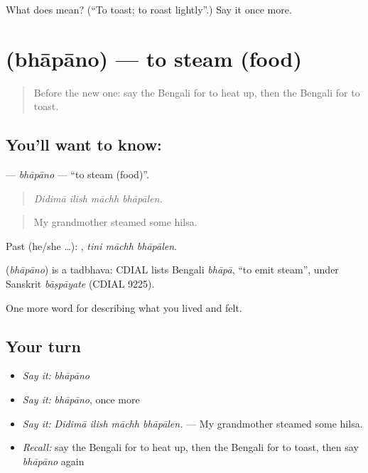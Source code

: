 \begin{tcolorbox}[breakable,colback=teal!4,colframe=teal!35!black,title={Before you move on}]
What does  mean? (\textquotedblleft{}To toast; to roast lightly\textquotedblright{}.) Say it once more.
\end{tcolorbox}
\section[\texorpdfstring{\bn{ভাপানো} (bhāpāno)}{ভাপানো (bhāpāno)}]{ (bhāpāno) — to steam (food)}

\label{lesson:BN-C514-bhapano}



\begin{quote}
Before the new one: say the Bengali for to heat up, then the Bengali for to toast.
\end{quote}

\subsection*{You'll want to know: }
\textbf{} — \emph{bhāpāno} — \textquotedblleft{}to steam (food)\textquotedblright{}.

\begin{quote}
   
\end{quote}

\begin{quote}
\emph{Didimā ilish māchh bhāpālen.}
\end{quote}

\begin{quote}
My grandmother steamed some hilsa.
\end{quote}

Past (he/she …):   , \emph{tini māchh bhāpālen}.

\begin{cousinweb}
\textbf{} (\emph{bhāpāno}) is a tadbhava: CDIAL lists Bengali \emph{bhāpā}, \textquotedblleft{}to emit steam\textquotedblright{}, under Sanskrit \emph{bāṣpāyate} (CDIAL 9225).
\end{cousinweb}

\begin{grammarlens}[title={What you've built}]
One more word for describing what you lived and felt.
\end{grammarlens}

\subsection*{Your turn}
\begin{itemize}
\raggedright
  \item \emph{Say it:} \emph{bhāpāno}
  \item \emph{Say it:} \emph{bhāpāno}, once more
  \item \emph{Say it:} \emph{Didimā ilish māchh bhāpālen.} — My grandmother steamed some hilsa.
  \item \emph{Recall:} say the Bengali for to heat up, then the Bengali for to toast, then say \emph{bhāpāno} again
\end{itemize}

